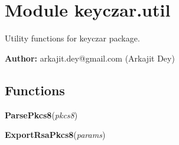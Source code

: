 %
%
%


\section{Module keyczar.util}

    \label{keyczar:util}
Utility functions for keyczar package.

\textbf{Author:} arkajit.dey@gmail.com (Arkajit Dey)





  \subsection{Functions}

    \label{keyczar:util:ParsePkcs8}

    \vspace{0.5ex}

\hspace{.8\funcindent}\begin{boxedminipage}{\funcwidth}

    \raggedright \textbf{ParsePkcs8}(\textit{pkcs8})

\setlength{\parskip}{2ex}
\setlength{\parskip}{1ex}
    \end{boxedminipage}

    \label{keyczar:util:ExportRsaPkcs8}

    \vspace{0.5ex}

\hspace{.8\funcindent}\begin{boxedminipage}{\funcwidth}

    \raggedright \textbf{ExportRsaPkcs8}(\textit{params})

\setlength{\parskip}{2ex}
\setlength{\parskip}{1ex}
    \end{boxedminipage}

